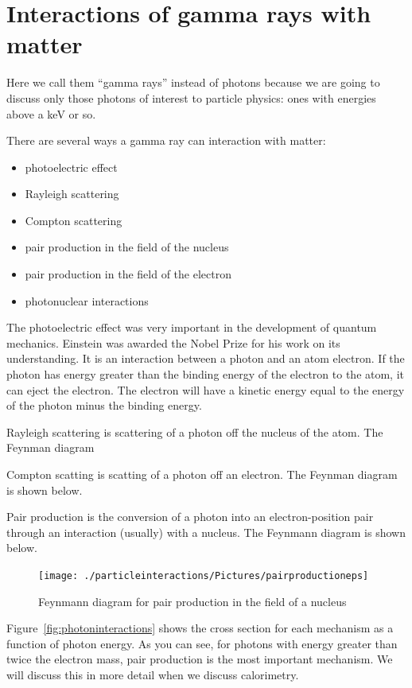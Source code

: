 \section{Interactions of gamma rays with matter}

Here we call them “gamma rays” instead of photons because we are going to discuss only those photons of interest to particle physics: ones with energies above a keV or so.

There are several ways a gamma ray can interaction with matter:
\begin{itemize}
\item photoelectric effect
\item Rayleigh scattering
\item Compton scattering
\item pair production in the field of the nucleus
\item pair production in the field of the electron
\item photonuclear interactions
\end{itemize}

The photoelectric effect was very important in the development of quantum mechanics.  Einstein was awarded the Nobel Prize for his work on its understanding.  It is an interaction between a photon and an atom electron.  If the photon has energy greater than the binding energy of the electron to the atom, it can eject the electron.  The electron will have a kinetic energy equal to the energy of the photon minus the binding energy.

Rayleigh scattering is scattering of a photon off the nucleus of the atom.  The Feynman diagram 

Compton scatting is scatting of a photon off an electron.  The Feynman diagram is shown below.  

Pair production is the conversion of a photon into an electron-position pair through an interaction (usually) with a nucleus.  The Feynmann diagram is shown below.


\begin{figure}[h]
\centering\texttt{[image: ./particleinteractions/Pictures/pairproductioneps]}
\caption{Feynmann diagram for pair production in the field of a nucleus}
\label{fig:pairproduction}
\end{figure}



Figure~\ref{fig:photoninteractions} shows the cross section for each mechanism as a 
function of photon energy.  As you can see, for photons with energy greater than twice the 
electron mass, pair production is the most important mechanism.  We will discuss this in more detail when we discuss calorimetry.


